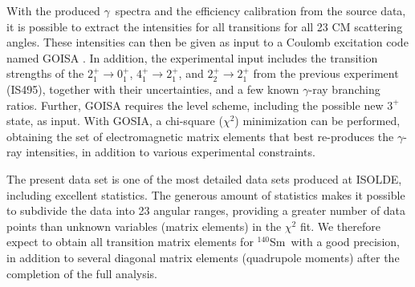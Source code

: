 \documentclass[twoside,english]{uiofysmaster/uiofysmaster}
\newcommand{\Sm}{$^{140}$Sm} %
\newcommand{\ga}{$\gamma$}
\begin{document}
With the produced \ga\ spectra and the efficiency calibration from the source data, it is possible to extract the intensities for all transitions for all 23 CM scattering angles. 
These intensities can then be given as input to a Coulomb excitation code named GOISA \cite{GOSIA}. 
In addition, the experimental input includes the transition strengths of the $2_1^+ \rightarrow 0_1^+$, $4_1^+ \rightarrow 2_1^+$, and $2_2^+ \rightarrow 2_1^+$ from the previous experiment (IS495), together with their uncertainties, and a few known \ga-ray branching ratios. 
Further, GOISA requires the level scheme, including the possible new $3^+$ state, as input. 
With GOSIA, a chi-square ($\chi^2$) minimization can be performed, obtaining the set of electromagnetic matrix elements that best re-produces the \ga-ray intensities, in addition to various experimental constraints.

The present data set is one of the most detailed data sets produced at ISOLDE, including excellent statistics. 
The generous amount of statistics makes it possible to subdivide the data into 23 angular ranges, providing a greater number of data points than unknown variables (matrix elements) in the $\chi^2$ fit.
We therefore expect to obtain all transition matrix elements for \Sm\ with a good precision, in addition to several diagonal matrix elements (quadrupole moments) after the completion of the full analysis.





%	


\end{document}
